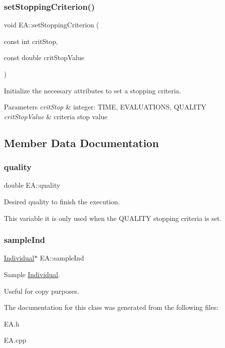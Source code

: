 \subsubsection{\texorpdfstring{set\+Stopping\+Criterion()}{setStoppingCriterion()}}
{\footnotesize\ttfamily void E\+A\+::set\+Stopping\+Criterion (\begin{DoxyParamCaption}\item[{const int}]{crit\+Stop,  }\item[{const double}]{crit\+Stop\+Value }\end{DoxyParamCaption})}



Initialize the necessary attributes to set a stopping criteria. 


\begin{DoxyParams}{Parameters}
{\em crit\+Stop} & integer\+: T\+I\+ME, E\+V\+A\+L\+U\+A\+T\+I\+O\+NS, Q\+U\+A\+L\+I\+TY \\
\hline
{\em crit\+Stop\+Value} & criteria stop value \\
\hline
\end{DoxyParams}


\subsection{Member Data Documentation}
\mbox{\label{classEA_ad62e844dcae9b5c7724ab56a9aea2dc9}} 
\subsubsection{\texorpdfstring{quality}{quality}}
{\footnotesize\ttfamily double E\+A\+::quality\hspace{0.3cm}{\ttfamily [private]}}



Desired quality to finish the execution. 

This variable it is only used when the Q\+U\+A\+L\+I\+TY stopping criteria is set. \mbox{\label{classEA_aee2992080a3ffc95c9edea9cc142f62d}} 
\subsubsection{\texorpdfstring{sample\+Ind}{sampleInd}}
{\footnotesize\ttfamily \mbox{\hyperlink{classIndividual}{Individual}}$\ast$ E\+A\+::sample\+Ind\hspace{0.3cm}{\ttfamily [private]}}



Sample \mbox{\hyperlink{classIndividual}{Individual}}. 

Useful for copy purposes. 

The documentation for this class was generated from the following files\+:\begin{DoxyCompactItemize}
\item 
E\+A.\+h\item 
E\+A.\+cpp\end{DoxyCompactItemize}
